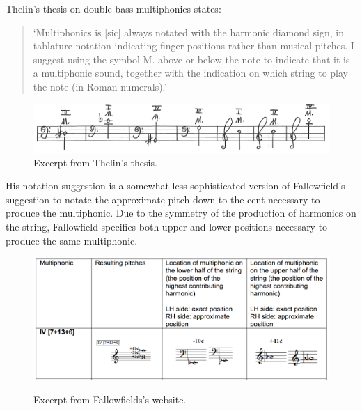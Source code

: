 Thelin's thesis on double bass multiphonics states:
\begin{quotation}
    `Multiphonics is [sic] always notated with the harmonic diamond sign, in tablature notation
indicating finger positions rather than musical pitches. I suggest using the symbol M. above or
below the note to indicate that it is a multiphonic sound, together with the indication on which
string to play the note (in Roman numerals).'\autocite[6]{thelinMultiphonicsDoubleBass2011}
\end{quotation}

\begin{figure}
    \includegraphics[width=\linewidth]{./resources/thelinMultiphonicNotation.png}
    \caption{Excerpt from Thelin's thesis.}
  \label{fig:Excerpt from Thelin's thesis}
  \end{figure}
His notation suggestion is a somewhat less sophisticated version of Fallowfield's suggestion to notate the approximate pitch down to the cent necessary to produce the multiphonic. 
Due to the symmetry of the production of harmonics on the string, Fallowfield specifies both upper and lower positions necessary to produce the same multiphonic.\autocite[index/the-string/multiphonics-and-other-multiple-sounds/fingeringcharts.html]{fallowfieldCelloMap}
\begin{figure}
    \includegraphics[width=\linewidth]{./resources/fallowfieldMultiphonicFingering.png}
    \caption{Excerpt from Fallowfields's website.}\autocite[]{fallowfieldCelloMap}
\label{fig:Excerpt from Fallowfields's website}
  \end{figure}


